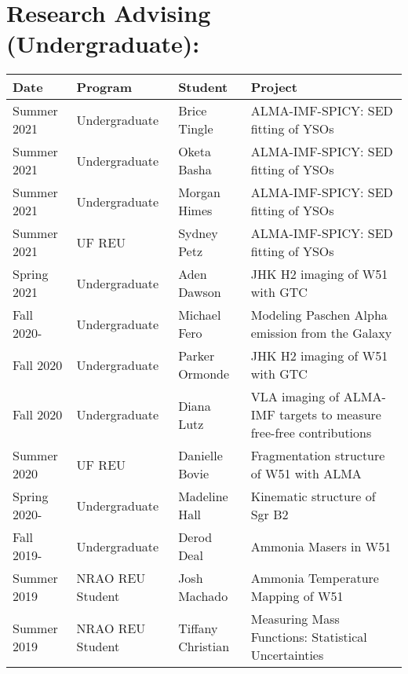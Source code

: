 \section*{Research Advising (Undergraduate): }
\vspace{-12pt}
\begin{tabular}{p{0.75in}p{1.3in}lp{2.6in}}
    Date  & Program & Student &  Project \\
    \hline
    Summer 2021 & Undergraduate &                               Brice Tingle    &  ALMA-IMF-SPICY: SED fitting of YSOs \\
    Summer 2021 & Undergraduate &                               Oketa Basha    &  ALMA-IMF-SPICY: SED fitting of YSOs \\
    Summer 2021 & Undergraduate &                               Morgan Himes    &  ALMA-IMF-SPICY: SED fitting of YSOs \\
    Summer 2021 & UF REU &                                      Sydney Petz    &  ALMA-IMF-SPICY: SED fitting of YSOs \\
    Spring 2021 & Undergraduate &                               Aden Dawson    &  JHK H2 imaging of W51 with GTC \\
    Fall 2020- & Undergraduate &                               Michael Fero    &  Modeling Paschen Alpha emission from the Galaxy \\
    Fall 2020 & Undergraduate &                               Parker Ormonde    &  JHK H2 imaging of W51 with GTC \\
    Fall 2020 & Undergraduate &                               Diana Lutz    &  VLA imaging of ALMA-IMF targets to measure free-free contributions \\
    Summer 2020 & UF REU &                               Danielle Bovie    &  Fragmentation structure of W51 with ALMA \\
    Spring 2020- & Undergraduate &                               Madeline Hall    &  Kinematic structure of Sgr B2 \\
    Fall 2019- & Undergraduate &                               Derod Deal    &  Ammonia Masers in W51 \\
    Summer 2019 & NRAO REU Student &                                              Josh Machado    &  Ammonia Temperature Mapping of W51 \\
    Summer 2019 & NRAO REU Student &                                              Tiffany Christian    &  Measuring Mass Functions: Statistical Uncertainties \\

\end{tabular}
